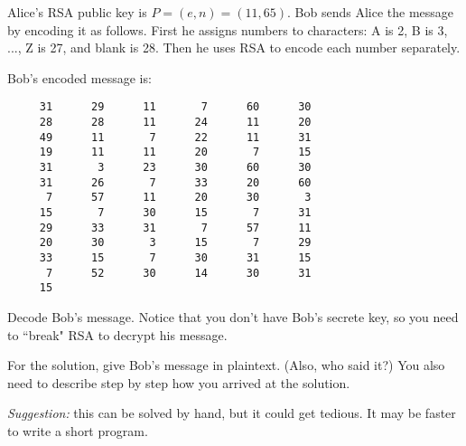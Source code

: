
\begin{problem}
Alice's RSA public key is $P = (e,n) = (11,65)$.
Bob sends Alice the message by encoding it as follows.
First he assigns numbers to characters:
A is 2, B is 3, ..., Z is 27, and blank is 28. Then he
uses RSA to encode each number separately. 

Bob's encoded message is:

\begin{verbatim}
     31      29      11       7      60      30
     28      28      11      24      11      20
     49      11       7      22      11      31
     19      11      11      20       7      15
     31       3      23      30      60      30
     31      26       7      33      20      60
      7      57      11      20      30       3
     15       7      30      15       7      31
     29      33      31       7      57      11
     20      30       3      15       7      29
     33      15       7      30      31      15
      7      52      30      14      30      31
     15
\end{verbatim}

Decode Bob's message.
Notice that you don't have Bob's secrete key, so you
need to ``break" RSA to decrypt his message.

For the solution, give Bob's message in plaintext. (Also, who said it?)
You also need to describe step by step how you arrived at the solution. 

\emph{Suggestion:} this can be solved by hand, but it could get tedious. It may
be faster to write a short program.
\end{problem}



